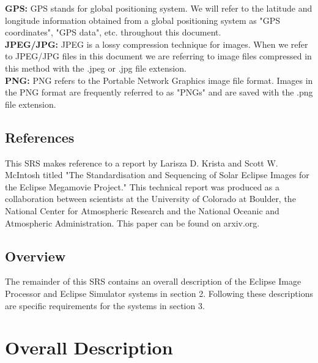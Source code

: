 \documentclass[10pt, onecolumn, draftclsnofoot, letterpaper, compsoc]{IEEEtran}
\begin{document}
	\noindent \textbf{GPS:}
	GPS stands for global positioning system. We will refer to the
	latitude and longitude information obtained from a global positioning 
	system as "GPS coordinates", "GPS data", etc. throughout this document. \\

	\noindent \textbf{JPEG/JPG:}
	JPEG is a lossy compression technique for images. When we refer
	to JPEG/JPG files in this document we are referring to image files 
	compressed in this method with the .jpeg or .jpg file extension. \\

	\noindent \textbf{PNG:}
	PNG refers to the Portable Network Graphics image file format. 
	Images in the PNG format are frequently referred to as "PNGs" and are 
	saved with the .png file extension. 


\subsection{References}

This SRS makes reference to a report by Larisza D. Krista and Scott W.  
McIntosh titled "The Standardisation and Sequencing of Solar Eclipse Images for 
the Eclipse Megamovie Project." This technical report was produced as a 
collaboration between scientists at the University of Colorado at Boulder, the
National Center for Atmospheric Research and the National Oceanic and 
Atmospheric Administration. This paper can be found on arxiv.org.

\subsection{Overview}

The remainder of this SRS contains an overall description of the Eclipse Image
 Processor and Eclipse Simulator systems in section 2. Following these 
 descriptions are specific requirements for the systems in section 3.

\newpage
\section{Overall Description}
\end{document}
